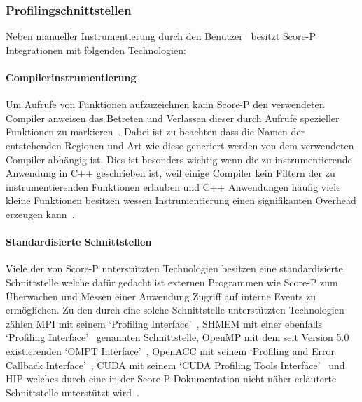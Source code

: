 \documentclass[german,proseminar,hyperref,utf8,lof]{zihpub}
\begin{document}
    \subsubsection{Profilingschnittstellen}
    Neben manueller Instrumentierung durch den Benutzer~
    besitzt Score-P Integrationen mit folgenden Technologien:

    \paragraph{Compilerinstrumentierung}
    Um Aufrufe von Funktionen aufzuzeichnen kann Score-P den verwendeten Compiler
    anweisen das Betreten und Verlassen dieser durch Aufrufe spezieller Funktionen
    zu markieren~.
    Dabei ist zu beachten dass die Namen der entstehenden Regionen und Art wie diese generiert
    werden von dem verwendeten Compiler abhängig ist.
    Dies ist besonders wichtig wenn die zu instrumentierende Anwendung in C++ geschrieben ist,
    weil einige Compiler kein Filtern der zu instrumentierenden Funktionen erlauben und C++
    Anwendungen häufig viele kleine Funktionen besitzen wessen Instrumentierung einen signifikanten
    Overhead erzeugen kann~.

    \paragraph{Standardisierte Schnittstellen}
    Viele der von Score-P unterstützten Technologien besitzen eine standardisierte Schnittstelle
    welche dafür gedacht ist externen Programmen wie Score-P zum Überwachen und Messen einer Anwendung
    Zugriff auf interne Events zu ermöglichen.
    Zu den durch eine solche Schnittstelle unterstützten Technologien zählen MPI mit seinem
    `Profiling Interface'~, SHMEM mit einer ebenfalls
    `Profiling Interface'~ genannten Schnittstelle, OpenMP mit dem seit
    Version 5.0 existierenden `OMPT Interface'~, OpenACC mit seinem
    `Profiling and Error Callback Interface'~, CUDA mit seinem
    `CUDA Profiling Tools Interface'~ und HIP welches durch eine in der
    Score-P Dokumentation nicht näher erläuterte Schnittstelle unterstützt
    wird~.
\end{document}
